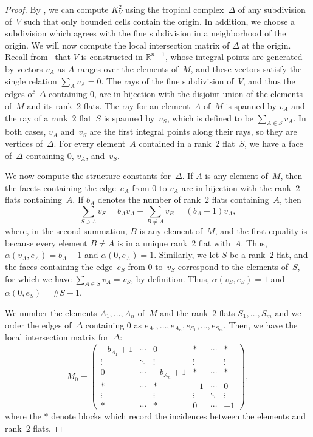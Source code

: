 \documentclass[11pt]{amsart}
\theoremstyle{definition}
\newcommand{\RR}{\mathbb R}
\begin{document}
\begin{proof}
By \cite[Prop.~3.9]{cartwright-complexes}, we can
compute $K_V^2$ using the tropical complex~$\Delta$ of any subdivision
of~$V$ such that only bounded cells contain the origin. In addition, we choose a
subdivision which agrees with the fine subdivision in a neighborhood of the
origin.
We will now compute the local intersection matrix of
$\Delta$ at the origin. Recall from~\cite{ardila-klivans} that $V$ is
constructed in $\RR^{n-1}$, whose integral points are generated by vectors $v_A$
as $A$ ranges over the elements of~$M$, and these vectors satisfy the single
relation $\sum_A v_A = 0$. The rays of the fine
subdivision of~$V$, and thus the edges of~$\Delta$ containing $0$, are in
bijection with the disjoint union of the elements of~$M$ and its rank~$2$ flats.
The ray for an element~$A$ of~$M$ is spanned by $v_A$ and the ray of a rank~$2$
flat~$S$ is spanned by~$v_S$, which is defined to be $\sum_{A \in S} v_A$. In
both cases, $v_A$ and~$v_S$ are the first integral points along their rays, so
they are vertices of~$\Delta$. For every element~$A$ contained in a rank~$2$
flat~$S$, we have a face of~$\Delta$ containing $0$, $v_A$, and~$v_S$.

We now compute the structure constants for~$\Delta$. If $A$ is any element
of~$M$, then the facets containing the edge~$e_A$ from $0$ to $v_A$ are in
bijection with the rank~$2$ flats containing~$A$. If $b_A$ denotes the number of
rank~$2$ flats containing~$A$, then
\begin{equation*}
\sum_{S \ni A} v_S = b_A v_A + \sum_{B \neq A} v_B = (b_A - 1) v_A,
\end{equation*}
where, in the second summation, $B$ is any element of~$M$, and the first
equality is because
every element $B \neq A$ is in a unique rank~$2$ flat with~$A$.
Thus, $\alpha(v_A, e_A) = b_A - 1$ and
$\alpha(0, e_A) = 1$.
Similarly, we let $S$ be a rank~$2$ flat, and the faces containing the
edge~$e_S$ from $0$ to~$v_S$ correspond to the elements of~$S$, for which we
have $\sum_{A \in S} v_A = v_S$, by definition. Thus, $\alpha(v_S, e_S) = 1$ and
$\alpha(0, e_S) = \# S - 1$.

We number the elements $A_1, \ldots, A_n$ of~$M$
and the rank~$2$ flats $S_1, \ldots, S_m$ and we order the edges of~$\Delta$
containing $0$ as $e_{A_1}, \ldots, e_{A_n}, e_{S_1}, \ldots, e_{S_m}$. Then, we
have the local intersection matrix for~$\Delta$:
\begin{equation}\label{eq:local-matroid}
M_0 = \begin{pmatrix}
-b_{A_1} + 1 & \cdots & 0 & * & \cdots & * \\
\vdots & \ddots & \vdots & \vdots & & \vdots \\
0 & \cdots & -b_{A_n} + 1 & * & \cdots & * \\
* & \cdots & * & -1 & \cdots & 0 \\
\vdots & & \vdots & \vdots & \ddots & \vdots \\
* & \cdots & * & 0 & \cdots & -1
\end{pmatrix},
\end{equation}
where the $*$ denote blocks which record the incidences between the elements and
rank~$2$ flats.


\end{proof}
\end{document}
